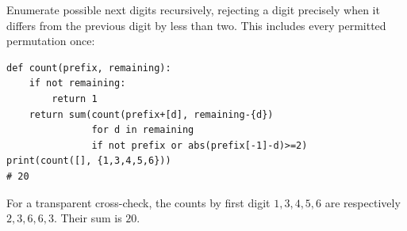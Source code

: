 Enumerate possible next digits recursively, rejecting a digit precisely when it differs from the previous digit by less than two. This includes every permitted permutation once:
\begin{verbatim}
def count(prefix, remaining):
    if not remaining:
        return 1
    return sum(count(prefix+[d], remaining-{d})
               for d in remaining
               if not prefix or abs(prefix[-1]-d)>=2)
print(count([], {1,3,4,5,6}))
# 20
\end{verbatim}
For a transparent cross-check, the counts by first digit $1,3,4,5,6$ are respectively $2,3,6,6,3$. Their sum is $\boxed{20}$.
